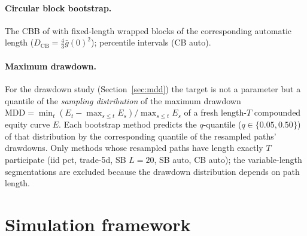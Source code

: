 \documentclass[11pt]{article}
\newcommand{\mdd}{\mathrm{MDD}}
\begin{document}
\paragraph{Circular block bootstrap.} The CBB of \citet{politis1992circular}
with fixed-length wrapped blocks of the corresponding automatic length
($D_{\mathrm{CB}} = \tfrac43 \bar g(0)^2$); percentile intervals
(\textsf{CB auto}).

\paragraph{Maximum drawdown.} For the drawdown study
(Section~\ref{sec:mdd}) the target is not a parameter but a quantile of the
\emph{sampling distribution} of the maximum drawdown
$\mdd = \min_t (E_t - \max_{s\le t}E_s)/\max_{s\le t}E_s$ of a fresh length-$T$
compounded equity curve $E$. Each bootstrap method predicts the $q$-quantile
($q\in\{0.05,0.50\}$) of that distribution by the corresponding quantile of the
resampled paths' drawdowns. Only methods whose resampled paths have length
exactly $T$ participate (\textsf{iid pct}, \textsf{trade-5d},
\textsf{SB $L{=}20$}, \textsf{SB auto}, \textsf{CB auto}); the variable-length
segmentations are excluded because the drawdown distribution depends on path
length.

\section{Simulation framework}
\label{sec:framework}
\end{document}
